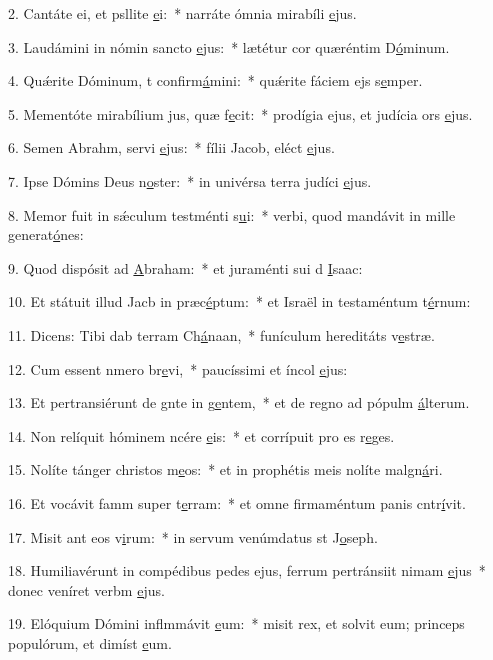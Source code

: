 2. Cantáte ei, et psllite \uline{e}i:~* narráte ómnia mirabíli \uline{e}jus.\par 
3. Laudámini in nómin sancto \uline{e}jus:~* lætétur cor quæréntim D\uline{ó}minum.\par 
4. Quǽrite Dóminum, t confirm\uline{á}mini:~* quǽrite fáciem ejs s\uline{e}mper.\par 
5. Mementóte mirabílium jus, quæ f\uline{e}cit:~* prodígia ejus, et judícia ors \uline{e}jus.\par 
6. Semen Abrahm, servi \uline{e}jus:~* fílii Jacob, eléct \uline{e}jus.\par 
7. Ipse Dómins Deus n\uline{o}ster:~* in univérsa terra judíci \uline{e}jus.\par 
8. Memor fuit in sǽculum testménti s\uline{u}i:~* verbi, quod mandávit in mille generat\uline{ó}nes:\par 
9. Quod dispósit ad \uline{A}braham:~* et juraménti sui d \uline{I}saac:\par 
10. Et státuit illud Jacb in præc\uline{é}ptum:~* et Israël in testaméntum t\uline{é}rnum:\par 
11. Dicens: Tibi dab terram Ch\uline{á}naan,~* funículum hereditáts v\uline{e}stræ.\par 
12. Cum essent nmero br\uline{e}vi,~* paucíssimi et íncol \uline{e}jus:\par 
13. Et pertransiérunt de gnte in g\uline{e}ntem,~* et de regno ad pópulm \uline{á}lterum.\par 
14. Non relíquit hóminem ncére \uline{e}is:~* et corrípuit pro es r\uline{e}ges.\par 
15. Nolíte tánger christos m\uline{e}os:~* et in prophétis meis nolíte malgn\uline{á}ri.\par 
16. Et vocávit famm super t\uline{e}rram:~* et omne firmaméntum panis cntr\uline{í}vit.\par 
17. Misit ant eos v\uline{i}rum:~* in servum venúmdatus st J\uline{o}seph.\par 
18. Humiliavérunt in compédibus pedes ejus, ferrum pertránsiit nimam \uline{e}jus~* donec veníret verbm \uline{e}jus.\par 
19. Elóquium Dómini inflmmávit \uline{e}um:~* misit rex, et solvit eum; princeps populórum, et dimíst \uline{e}um.\par 
